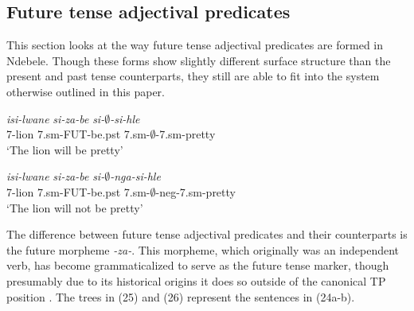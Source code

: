 \documentclass[output=paper]{langsci/langscibook}
\begin{document}
\subsection{Future tense adjectival predicates}

This section looks at the way future tense adjectival predicates are formed in Ndebele. Though these forms show slightly different surface structure than the present and past tense counterparts, they still are able to fit into the system otherwise outlined in this paper.


\begin{exe}
\ex \begin{xlist}
\ex \gll \textit{isi-lwane} \textit{si-za-be} \textit{si-$\emptyset$-si-hle}\\
       7-lion 7.{\sc sm}-FUT-be.{\sc pst} 7.{\sc sm}-$\emptyset$-7.{\sc sm}-pretty\\
    \glt `The lion will be pretty' 

\ex \gll \textit{isi-lwane} \textit{si-za-be} \textit{si-$\emptyset$-nga-si-hle}\\
       7-lion 7.{\sc sm}-FUT-be.{\sc pst} 7.{\sc sm}-$\emptyset$-{\sc neg}-7.{\sc sm}-pretty\\
    \glt `The lion will not be pretty' 
\end{xlist}
\end{exe}

The difference between future tense adjectival predicates and their counterparts is the future morpheme \textit{-za-}. This morpheme, which originally was an independent verb, has become grammaticalized to serve as the future tense marker, though presumably due to its historical origins it does so outside of the canonical TP position \citep{Sibanda2004}. The trees in (25) and (26) represent the sentences in (24a-b).
\end{document}

